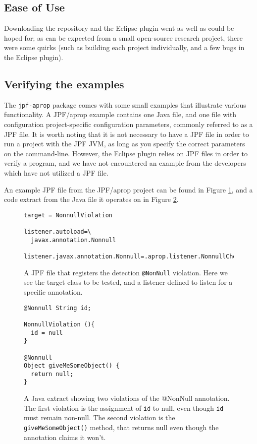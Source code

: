 \documentclass[twocolumn]{article}
\begin{document}
\subsection{Ease of Use}
Downloading the repository and the Eclipse plugin went as well as could be hoped for; as can be expected from a small open-source research project, there were some quirks (such as building each project individually, and a few bugs in the Eclipse plugin).

\subsection{Verifying the examples}
The \texttt{jpf-aprop} package comes with some small examples that illustrate various functionality. A JPF/aprop example contains one Java file, and one file with configuration project-specific configuration parameters, commonly referred to as a JPF file. It is worth noting that it is not necessary to have a JPF file in order to run a project with the JPF JVM, as long as you specify the correct parameters on the command-line. However, the Eclipse plugin relies on JPF files in order to verify a program, and we have not encountered an example from the developers which have not utilized a JPF file. 

An example JPF file from the JPF/aprop project can be found in Figure \ref{listing:jpffile}, and a code extract from the Java file it operates on in Figure \ref{listing:nonnull}.

\begin{figure}[tb]
    \lstset{language=,breaklines=true}
    \begin{lstlisting}
target = NonnullViolation

listener.autoload=\
  javax.annotation.Nonnull

listener.javax.annotation.Nonnull=.aprop.listener.NonnullChecker
    \end{lstlisting}
    \caption{A JPF file that registers the detection \texttt{@NonNull} violation. Here we see the target class to be tested, and a listener defined to listen for a specific annotation.}
    \label{listing:jpffile}
\end{figure}

\begin{figure}[tb]
    \lstset{language=java,breaklines=true}
    \begin{lstlisting}
@Nonnull String id;

NonnullViolation (){
  id = null
}

@Nonnull
Object giveMeSomeObject() {
  return null;
}

\end{lstlisting}
	\caption{A Java extract showing two violations of the @NonNull annotation. The first violation is the assignment of \texttt{id} to null, even though \texttt{id} must remain non-null. The second violation is the \texttt{giveMeSomeObject()} method, that returns null even though the annotation claims it won't.}
	    \label{listing:nonnull}
	\end{figure}
\end{document}
